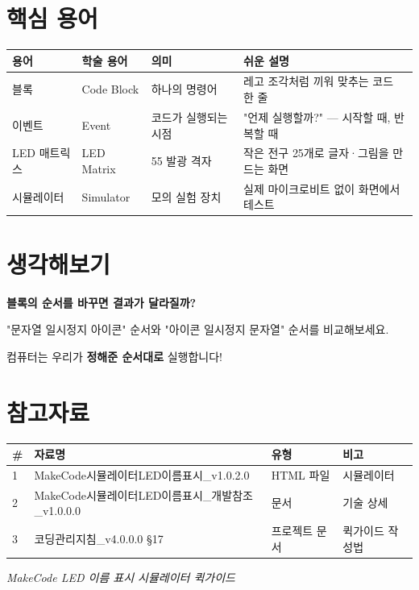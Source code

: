 \documentclass[11pt,a4paper]{article}
\begin{document}
\section*{ 핵심 용어}

\begin{center}
\renewcommand{\arraystretch}{1.4}
\begin{tabular}{|p{2.2cm}|p{1.8cm}|p{3.7cm}|p{7.3cm}|}
\hline
\rowcolor{tableheader}
\textbf{용어} & \textbf{학술 용어} & \textbf{의미} & \textbf{쉬운 설명} \\
\hline
블록 & Code Block & 하나의 명령어 & 레고 조각처럼 끼워 맞추는 코드 한 줄 \\
\hline
이벤트 & Event & 코드가 실행되는 시점 & "언제 실행할까?" — 시작할 때, 반복할 때 \\
\hline
LED 매트릭스 & LED Matrix & 5\texttimes{}5 발광 격자 & 작은 전구 25개로 글자·그림을 만드는 화면 \\
\hline
시뮬레이터 & Simulator & 모의 실험 장치 & 실제 마이크로비트 없이 화면에서 테스트 \\
\hline
\end{tabular}
\end{center}


\section*{ 생각해보기}

\begin{tcolorbox}[summarybox]
\textbf{블록의 순서를 바꾸면 결과가 달라질까?}

\vspace{0.3em}
"문자열 \textrightarrow{} 일시정지 \textrightarrow{} 아이콘" 순서와 "아이콘 \textrightarrow{} 일시정지 \textrightarrow{} 문자열" 순서를 비교해보세요.

컴퓨터는 우리가 \textbf{정해준 순서대로} 실행합니다!

\end{tcolorbox}


\section*{참고자료}

\begin{center}
\renewcommand{\arraystretch}{1.4}
\begin{tabular}{|p{1.5cm}|p{8.1cm}|p{2.5cm}|p{2.9cm}|}
\hline
\rowcolor{tableheader}
\textbf{\#} & \textbf{자료명} & \textbf{유형} & \textbf{비고} \\
\hline
1 & MakeCode시뮬레이터LED이름표시\_v1.0.2.0 & HTML 파일 & 시뮬레이터 \\
\hline
2 & MakeCode시뮬레이터LED이름표시\_개발참조\_v1.0.0.0 & 문서 & 기술 상세 \\
\hline
3 & 코딩관리지침\_v4.0.0.0 \S{}17 & 프로젝트 문서 & 퀵가이드 작성법 \\
\hline
\end{tabular}
\end{center}


\vfill
\begin{center}
\small\color{lightbrown}
\textit{MakeCode LED 이름 표시 시뮬레이터 퀵가이드}
\end{center}
\end{document}
